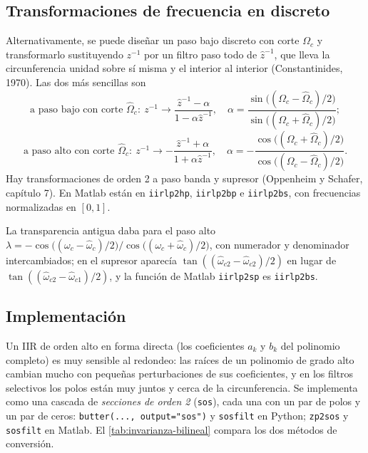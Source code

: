 \documentclass[11pt,a4paper]{scrartcl}
\begin{document}
\subsection{Transformaciones de frecuencia en discreto}

Alternativamente, se puede diseñar un paso bajo discreto con corte $\Omega_c$ y transformarlo sustituyendo $z^{-1}$ por un filtro paso todo de $\hat z^{-1}$, que lleva la circunferencia unidad sobre sí misma y el interior al interior (Constantinides, 1970). Las dos más sencillas son
\[
  \text{a paso bajo con corte }\hat\Omega_c:\ z^{-1}\to\frac{\hat z^{-1}-\alpha}{1-\alpha\hat z^{-1}},\quad\alpha=\frac{\sin\big((\Omega_c-\hat\Omega_c)/2\big)}{\sin\big((\Omega_c+\hat\Omega_c)/2\big)};
\]
\[
  \text{a paso alto con corte }\hat\Omega_c:\ z^{-1}\to-\frac{\hat z^{-1}+\alpha}{1+\alpha\hat z^{-1}},\quad\alpha=-\frac{\cos\big((\Omega_c+\hat\Omega_c)/2\big)}{\cos\big((\Omega_c-\hat\Omega_c)/2\big)}.
\]
Hay transformaciones de orden 2 a paso banda y supresor (Oppenheim y Schafer, capítulo 7). En Matlab están en \texttt{iirlp2hp}, \texttt{iirlp2bp} e \texttt{iirlp2bs}, con frecuencias normalizadas en $[0,1]$.

\begin{errata}
  La transparencia antigua daba para el paso alto $\lambda=-\cos\big((\omega_c-\hat\omega_c)/2\big)/\cos\big((\omega_c+\hat\omega_c)/2\big)$, con numerador y denominador intercambiados; en el supresor aparecía $\tan((\hat\omega_{c2}-\hat\omega_{c2})/2)$ en lugar de $\tan((\hat\omega_{c2}-\hat\omega_{c1})/2)$, y la función de Matlab \texttt{iirlp2sp} es \texttt{iirlp2bs}.
\end{errata}

\subsection{Implementación}

Un IIR de orden alto en forma directa (los coeficientes $a_k$ y $b_k$ del polinomio completo) es muy sensible al redondeo: las raíces de un polinomio de grado alto cambian mucho con pequeñas perturbaciones de sus coeficientes, y en los filtros selectivos los polos están muy juntos y cerca de la circunferencia. Se implementa como una cascada de \emph{secciones de orden 2} (\texttt{sos}), cada una con un par de polos y un par de ceros: \texttt{butter(..., output="sos")} y \texttt{sosfilt} en Python; \texttt{zp2sos} y \texttt{sosfilt} en Matlab. El \cref{tab:invarianza-bilineal} compara los dos métodos de conversión.
\end{document}
